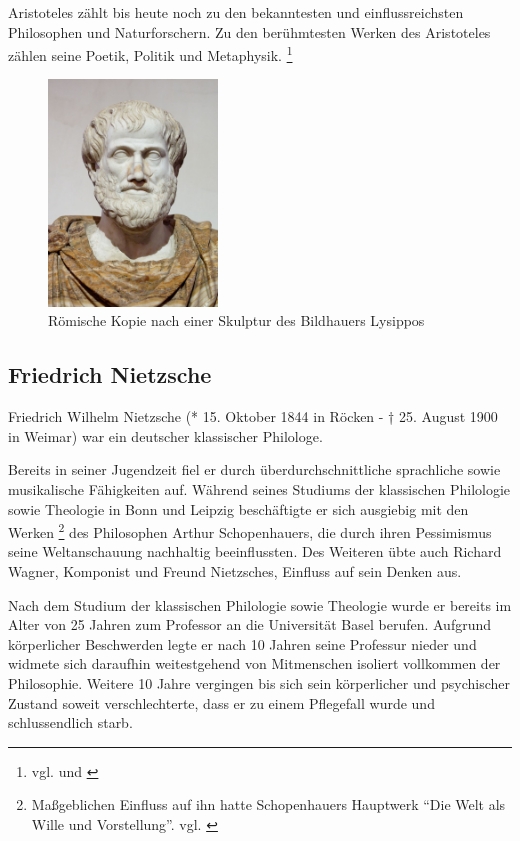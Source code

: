 Aristoteles zählt bis heute noch zu den bekanntesten und einflussreichsten Philosophen und Naturforschern. Zu den berühmtesten Werken des Aristoteles zählen seine Poetik, Politik und Metaphysik.
\footnote{vgl. \cite{Aristoteles1} und \cite{Aristoteles2}}
\begin{figure}[H]
\centering 
 \includegraphics[width=0.4\textwidth]{Bilder/kap3/Aristoteles} 
 \caption{Römische Kopie nach einer Skulptur des Bildhauers Lysippos \cite{WikiAR}  \label{portraitAristotles}}
\end{figure}

\subsection{Friedrich Nietzsche}
Friedrich Wilhelm Nietzsche (* 15. Oktober 1844 in Röcken - † 25. August 1900 in Weimar) war ein deutscher klassischer Philologe.

Bereits in seiner Jugendzeit fiel er durch überdurchschnittliche sprachliche sowie musikalische Fähigkeiten auf.
Während seines Studiums der klassischen Philologie sowie Theologie in Bonn und Leipzig beschäftigte er sich ausgiebig mit den Werken
\footnote{Maßgeblichen Einfluss auf ihn hatte Schopenhauers Hauptwerk \enquote{Die Welt als Wille und Vorstellung}. vgl. \cite{Schopenhauer1}}
des Philosophen Arthur Schopenhauers, die durch ihren Pessimismus seine Weltanschauung nachhaltig beeinflussten.
Des Weiteren übte auch Richard Wagner, Komponist und Freund Nietzsches, Einfluss auf sein Denken aus.

Nach dem Studium der klassischen Philologie sowie Theologie wurde er bereits im Alter von 25 Jahren zum Professor an die Universität Basel berufen.
Aufgrund körperlicher Beschwerden legte er nach 10 Jahren seine Professur nieder und widmete sich daraufhin weitestgehend von Mitmenschen isoliert vollkommen der Philosophie.
Weitere 10 Jahre vergingen bis sich sein körperlicher und psychischer Zustand soweit verschlechterte, dass er zu einem Pflegefall wurde und schlussendlich starb.


